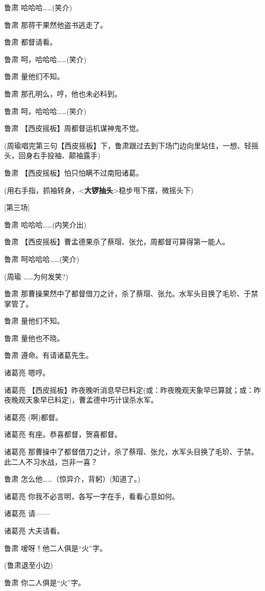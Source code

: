 鲁肃 哈哈哈\ldots{}\ldots{}(笑介)

鲁肃 那蒋干果然他盗书逃走了。

鲁肃 都督请看。

鲁肃 呵，哈哈哈\ldots{}\ldots{}(笑介)

鲁肃 量他们不知。

鲁肃 那孔明么，哼，他也未必料到。

鲁肃 呵，哈哈哈\ldots{}\ldots{}(笑介)

鲁肃 【西皮摇板】周都督运机谋神鬼不觉。

(周瑜唱完第三句【西皮摇板】下，鲁肃跟过去到下场门边向里站住，一想、轻摇头，回身右手投袖、颠袖露手)

鲁肃 【西皮摇板】怕只怕瞒不过南阳诸葛。

(用右手指，抓袖转身，\textless{}\textbf{大锣抽头}\textgreater{}稳步甩下摆，微摇头下)

{[}第三场{]}

鲁肃 哈哈哈\ldots{}\ldots{}(内笑介出)

鲁肃 【西皮摇板】曹孟德果杀了蔡瑁、张允，周都督可算得第一能人。

鲁肃 呵哈哈哈\ldots{}\ldots{}(笑介)

(周瑜 \ldots{}\ldots{}为何发笑?)

鲁肃
那曹操果然中了都督借刀之计，杀了蔡瑁、张允。水军头目换了毛玠、于禁掌管了。

鲁肃 量他们不知。

鲁肃 量他也不晓。

鲁肃 遵命。有请诸葛先生。

诸葛亮 嗯哼。

诸葛亮
【西皮摇板】昨夜晚听消息早已料定(或：昨夜晚观天象早已算就；或：昨夜晚观天象早已料定)，曹孟德中巧计误杀水军。

诸葛亮 (啊)都督。

诸葛亮 有座。恭喜都督，贺喜都督。

诸葛亮
那曹操中了都督借刀之计，杀了蔡瑁、张允，水军头目换了毛玠、于禁。此二人不习水战，岂非一喜？

鲁肃 怎么他\ldots{}\ldots{}（惊异介，背躬）(知道了。)

诸葛亮 你我不必言明，各写一字在手，看看心意如何。

诸葛亮 请------

诸葛亮 大夫请看。

鲁肃 嗳呀！他二人俱是``火''字。

(鲁肃退至小边)

鲁肃 你二人俱是``火''字。

